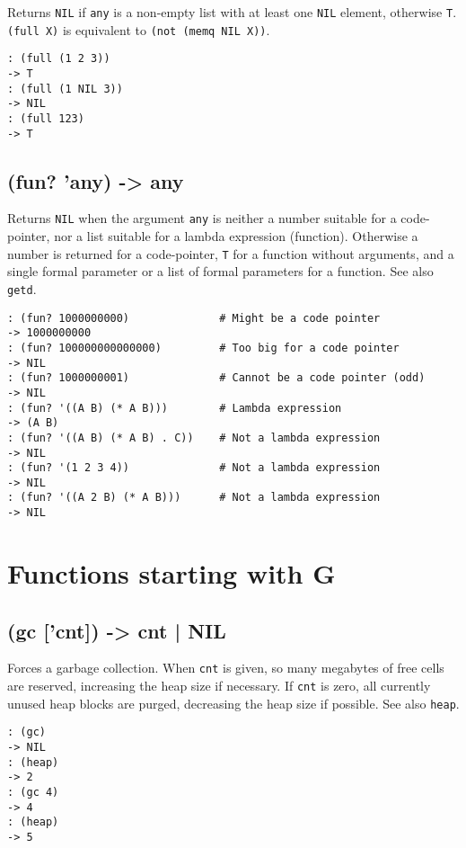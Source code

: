 {{{{{{Returns \texttt{NIL} if \texttt{any} is a non-empty list with at least one \texttt{NIL}
element, otherwise \texttt{T}. \texttt{(full X)} is equivalent to
\texttt{(not (memq NIL X))}.


\begin{verbatim}
: (full (1 2 3))
-> T
: (full (1 NIL 3))
-> NIL
: (full 123)
-> T
\end{verbatim}

 
\section{(fun? 'any) -> any}
\label{sec-8-1-6-27}


Returns \texttt{NIL} when the argument \texttt{any} is neither a number suitable for a
code-pointer, nor a list suitable for a lambda expression (function).
Otherwise a number is returned for a code-pointer, \texttt{T} for a function
without arguments, and a single formal parameter or a list of formal
parameters for a function. See also \texttt{getd}.


\begin{verbatim}
: (fun? 1000000000)              # Might be a code pointer
-> 1000000000
: (fun? 100000000000000)         # Too big for a code pointer
-> NIL
: (fun? 1000000001)              # Cannot be a code pointer (odd)
-> NIL
: (fun? '((A B) (* A B)))        # Lambda expression
-> (A B)
: (fun? '((A B) (* A B) . C))    # Not a lambda expression
-> NIL
: (fun? '(1 2 3 4))              # Not a lambda expression
-> NIL
: (fun? '((A 2 B) (* A B)))      # Not a lambda expression
-> NIL
\end{verbatim}


\chapter{Functions starting with G}
\label{sec-8-1-7}


 
\section{(gc ['cnt]) -> cnt | NIL}
\label{sec-8-1-7-1}


Forces a garbage collection. When \texttt{cnt} is given, so many megabytes of
free cells are reserved, increasing the heap size if necessary. If \texttt{cnt}
is zero, all currently unused heap blocks are purged, decreasing the
heap size if possible. See also \texttt{heap}.


\begin{verbatim}
: (gc)
-> NIL
: (heap)
-> 2
: (gc 4)
-> 4
: (heap)
-> 5
\end{verbatim}

}}}}}}
